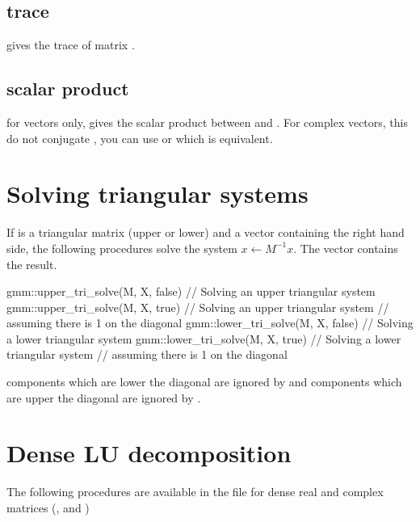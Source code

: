 \documentclass[11pt,a4paper]{article}
\begin{document}
\subsection{trace}
 gives the trace of matrix .

\subsection{scalar product} 

  for vectors only,  gives the scalar product between  and . For complex vectors, this do not conjugate , you can use  or  which is equivalent.

\section{Solving triangular systems}

If  is a triangular matrix (upper or lower) and  a vector containing the right hand side, the following procedures solve the system $x \leftarrow M^{-1}x$. The vector  contains the result.
\begin{cppcode}
   gmm::upper_tri_solve(M, X, false) // Solving an upper triangular system
   gmm::upper_tri_solve(M, X, true)  // Solving an upper triangular system
                                     // assuming there is 1 on the diagonal
   gmm::lower_tri_solve(M, X, false) // Solving a lower triangular system
   gmm::lower_tri_solve(M, X, true)  // Solving a lower triangular system
                                     // assuming there is 1 on the diagonal
\end{cppcode}
components which are lower the diagonal are ignored by  and components which are upper the diagonal are ignored by .

\section{Dense LU decomposition}

The following procedures are available in the file  for dense real and complex matrices (,  and )
\end{document}
